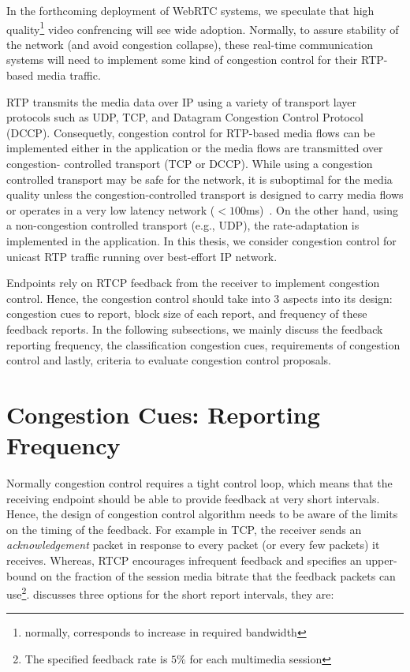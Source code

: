 In the forthcoming deployment of WebRTC systems, we speculate that high
quality\footnote{normally, corresponds to increase in required bandwidth}
video confrencing will see wide adoption. Normally, to assure stability of the
network (and avoid congestion collapse), these real-time communication systems
will need to implement some kind of congestion control for their RTP-based
media traffic.

RTP transmits the media data over IP using a variety of transport layer
protocols such as UDP, TCP, and Datagram Congestion Control Protocol (DCCP).
Consequetly, congestion control for RTP-based media flows can be implemented
either in the application or the media flows are transmitted over congestion-%
controlled transport (TCP or DCCP). While using a congestion controlled
transport may be safe for the network, it is suboptimal for the media quality
unless the congestion-controlled transport is designed to carry media flows or
operates in a very low latency network ($<100$ms)~\cite{Brosh:tcp-real-time}.
On the other hand, using a non-congestion controlled transport (e.g., UDP),
the rate-adaptation is implemented in the application.  In this thesis, we
consider congestion control for unicast RTP traffic running over best-effort
IP network.


Endpoints rely on RTCP feedback from the receiver to implement congestion
control. Hence, the congestion control should take into 3 aspects into its
design: congestion cues to report, block size of each report, and frequency of
these feedback reports. In the following subsections, we mainly discuss the
feedback reporting frequency, the classification congestion cues, requirements
of congestion control and lastly, criteria to evaluate congestion control
proposals.

\section{Congestion Cues: Reporting Frequency}

Normally congestion control requires a tight control loop, which means that
the receiving endpoint should be able to provide feedback at very short
intervals. Hence, the design of congestion control algorithm needs to be aware
of the limits on the timing of the feedback.  For example in TCP, the receiver
sends an \emph{acknowledgement} packet in response to every packet (or every
few packets) it receives. Whereas, RTCP encourages infrequent feedback and
specifies an upper-bound on the fraction of the session media bitrate that the
feedback packets can use\footnote{The specified feedback rate is $5\%$ for
each multimedia session}.  \cite{draft.rmcat.feedback} discusses three options
for the short report intervals, they are:

